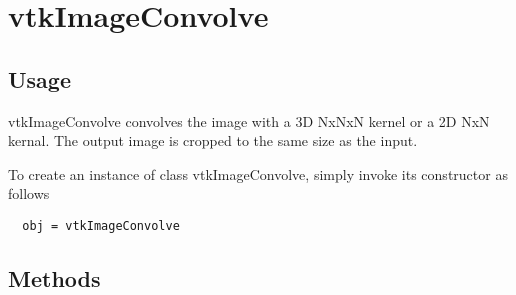 \section{vtkImageConvolve}

\subsection{Usage}

 vtkImageConvolve convolves the image with a 3D NxNxN kernel or a
 2D NxN kernal.  The output image is cropped to the same size as
 the input.

To create an instance of class vtkImageConvolve, simply
invoke its constructor as follows
\begin{verbatim}
  obj = vtkImageConvolve
\end{verbatim}
\subsection{Methods}

